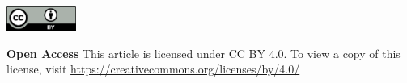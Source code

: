 \vspace{8mm}
\noindent
\includegraphics[height=8mm]{licenses/by}
\vspace{2mm}
\begin{spacing}{.6}
\noindent
\textbf{Open Access} This article is licensed under CC BY 4.0. To view a copy of this license, visit \url{https://creativecommons.org/licenses/by/4.0/}
\end{spacing}